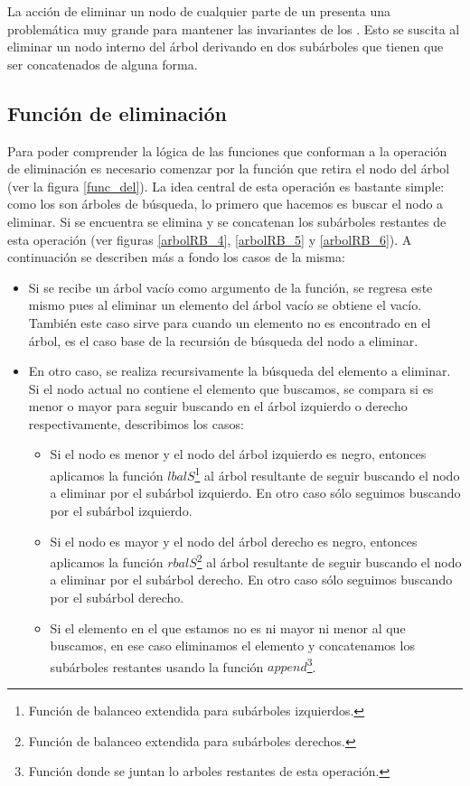 La acci\'on de eliminar un nodo de cualquier parte de un {\arn} presenta una problemática muy grande 
para mantener las invariantes de los {\arns}. Esto se suscita al eliminar un nodo interno del 
\'arbol derivando en dos subárboles que tienen que ser concatenados de alguna forma.

\subsection{Funci\'on de eliminaci\'on}

Para poder comprender la l\'ogica de las funciones que conforman a la operaci\'on de eliminaci\'on
es necesario comenzar por la funci\'on que retira el nodo del \'arbol (ver la figura \ref{func_del}).
La idea central de esta operaci\'on es bastante simple: como los {\arns} son \'arboles de búsqueda,
lo primero que hacemos es buscar el nodo a eliminar. Si se encuentra se elimina y se concatenan los
subárboles restantes de esta operaci\'on (ver figuras \ref{arbolRB_4}, \ref{arbolRB_5} y
\ref{arbolRB_6}). A continuaci\'on se describen m\'as a fondo los casos de la misma:

\begin{itemize}
    \item Si se recibe un \'arbol vacío como argumento de la funci\'on, se regresa este mismo pues
    al eliminar un elemento del \'arbol vacío se obtiene el vacío. También este caso sirve para
    cuando un elemento no es encontrado en el \'arbol, es el caso base de la recursi\'on de
    búsqueda del nodo a eliminar.
    \item En otro caso, se realiza recursivamente la búsqueda del elemento a eliminar. Si el nodo
    actual no contiene el elemento que buscamos, se compara si es menor o mayor para seguir
    buscando en el \'arbol izquierdo o derecho respectivamente, describimos los casos:
    \begin{itemize}
        \item Si el nodo es menor y el nodo del \'arbol izquierdo es negro, entonces aplicamos la 
        funci\'on \hyperref[lbalS]{$lbalS$}\footnote{Funci\'on de balanceo extendida para 
        subárboles izquierdos.} al \'arbol resultante de seguir buscando el nodo a eliminar por el 
        subárbol izquierdo. 
        En otro caso s\'olo seguimos buscando por el subárbol izquierdo.
        \item Si el nodo es mayor y el nodo del \'arbol derecho es negro, entonces aplicamos la 
        funci\'on \hyperref[lbalS]{$rbalS$}\footnote{Funci\'on de balanceo extendida para 
        subárboles derechos.} al \'arbol resultante de seguir buscando el nodo a eliminar por el 
        subárbol derecho. 
        En otro caso s\'olo seguimos buscando por el subárbol derecho.
        \item Si el elemento en el que estamos no es ni mayor ni menor al que buscamos, en ese
        caso eliminamos el elemento y concatenamos los subárboles restantes usando la función 
        \hyperref[func_app]{$append$}\footnote{Funci\'on donde se juntan lo arboles restantes de 
        esta operaci\'on.}.
    \end{itemize}
    
\end{itemize}

